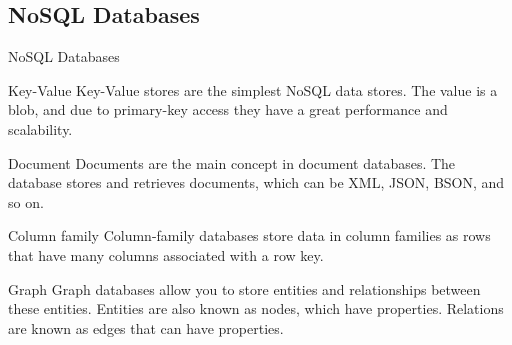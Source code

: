 \subsection{NoSQL Databases}
\begin{frame}{NoSQL Databases}
    \begin{block}{Key-Value}
        Key-Value stores are the simplest NoSQL data stores. The value is a blob, and due to primary-key access they have a great performance and scalability.
    \end{block}
    \begin{block}{Document}
        Documents are the main concept in document databases. The database stores and retrieves documents, which can be XML, JSON, BSON, and so on.
    \end{block}
    \begin{block}{Column family}
        Column-family databases store data in column families as rows that have many columns associated with a row key.
    \end{block}
    \begin{block}{Graph}
        Graph databases allow you to store entities and relationships between these entities. Entities are also known as nodes, which have properties. Relations are known as edges that can have properties. 
    \end{block}
    
\end{frame}
